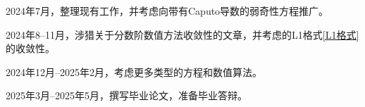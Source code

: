 2024年7月，整理现有工作，并考虑向带有Caputo导数的弱奇性方程推广。

2024年8--11月，涉猎关于分数阶数值方法收敛性的文章，并考虑\mainEquation 的L1格式\eqref{L1格式}的收敛性。

2024年12月--2025年2月，考虑更多类型的方程和数值算法。

2025年3月--2025年5月，撰写毕业论文，准备毕业答辩。